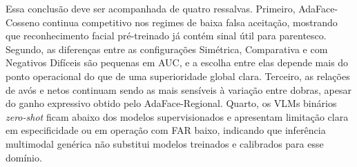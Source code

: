 Essa conclusão deve ser acompanhada de quatro ressalvas. Primeiro, AdaFace-Cosseno continua competitivo nos regimes de baixa falsa aceitação, mostrando que reconhecimento facial pré-treinado já contém sinal útil para parentesco. Segundo, as diferenças entre as configurações Simétrica, Comparativa e com Negativos Difíceis são pequenas em AUC, e a escolha entre elas depende mais do ponto operacional do que de uma superioridade global clara. Terceiro, as relações de avós e netos continuam sendo as mais sensíveis à variação entre dobras, apesar do ganho expressivo obtido pelo AdaFace-Regional. Quarto, os VLMs binários \textit{zero-shot} ficam abaixo dos modelos supervisionados e apresentam limitação clara em especificidade ou em operação com FAR baixo, indicando que inferência multimodal genérica não substitui modelos treinados e calibrados para esse domínio.
